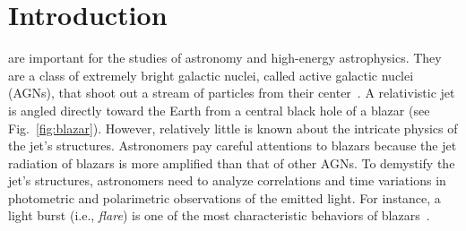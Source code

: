 \ifCLASSOPTIONcompsoc
{}
\else
\section{Introduction}
\label{sec:introduction}
\fi
 are important for the studies of astronomy and high-energy astrophysics. 
They are a class of extremely bright galactic nuclei, called active galactic nuclei (AGNs), that shoot out a stream of particles from their center~\cite{Antonucci1993a}. 
A relativistic jet is angled directly toward the Earth from a central black hole of a blazar (see Fig.~\ref{fig:blazar}).
However, relatively little is known about the intricate physics of the jet's structures. %
Astronomers pay careful attentions to blazars
because the jet radiation of blazars is more amplified than that of other AGNs.
To demystify the jet's structures,
astronomers need to analyze correlations and time variations in photometric and polarimetric observations of the emitted light.
For instance, a light burst (i.e., \textit{flare}) is one of the most characteristic behaviors of blazars~\cite{Bednarek1999, Atoyan2001}.
